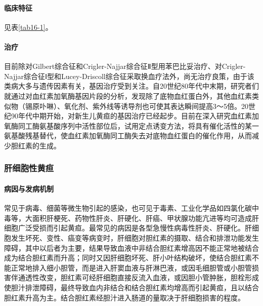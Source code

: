 \paragraph{临床特征}

见表\ref{tab16-1}。

\paragraph{治疗}

目前除对Gilbert综合征和Crigler-Najjar综合征Ⅱ型用苯巴比妥治疗、对Crigler-Najjar综合征Ⅰ型和Lucey-Driscoll综合征采取换血疗法外，尚无治疗良策，由于该类病大多与遗传因素有关，基因治疗受到关注。自20世纪80年代中末期，研究者们就通过对血红素加氧酶基因片段的分析，发现除了底物血红蛋白外，其他血红素类似物（锡原卟啉）、氧化剂、紫外线等诱导剂也可使其表达瞬间提高3～5倍。20世纪90年代中期开始，对新生儿黄疸的基因治疗已经起步。目前在深入研究血红素加氧酶同工酶氨基酸序列中活性部位后，试用定点诱变方法，将具有催化活性的某一氨基酸残基替代，使血红素加氧酶同工酶失去对底物血红蛋白的催化作用，从而减少胆红素的生成。

\subsubsection{肝细胞性黄疸}

\paragraph{病因与发病机制}

常见于病毒、细菌等微生物引起的感染，也可见于毒素、工业化学品如四氯化碳中毒等，大面积肝梗死、药物性肝炎、肝硬化、肝癌、甲状腺功能亢进等均可造成肝细胞广泛受损而引起黄疸。最常见的病因是各型急慢性病毒性肝炎、肝硬化。肝细胞发生坏死、变性、癌变等病变时，肝细胞对胆红素的摄取、结合和排泄功能发生障碍，其中以后者为主要，结果导致血液中非结合胆红素增高因不能正常地被结合成为结合胆红素而升高；同时又因肝细胞坏死、肝小叶结构破坏，使结合胆红素不能正常地排入细小胆管，而是进入肝窦血液与肝淋巴液，或因毛细胆管或小胆管损害伴通透性改变，胆红素可经肝细胞直接反流入血液，或因胆小管肿胀，胆栓形成使胆汁排泄障碍，最终导致血内非结合和结合胆红素均增高而引起黄疸，且以结合胆红素升高为主。结合胆红素经胆汁进入肠道的量取决于肝细胞损害的程度。

